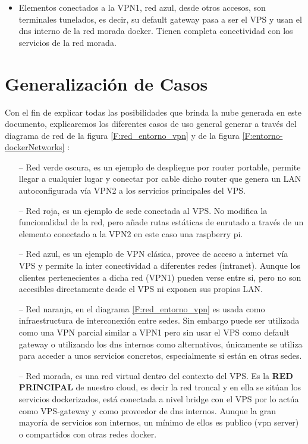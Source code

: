 \begin{itemize}
    \item Elementos conectados a la VPN1, red azul, desde otros accesos, son terminales tunelados, es decir, su default gateway pasa a ser el VPS y usan el dns interno de la red morada docker. Tienen completa conectividad con los servicios de la red morada.
\end{itemize}

\section{Generalización de Casos}
Con el fin de explicar todas las posibilidades que brinda la nube generada en este documento, explicaremos los diferentes casos de uso general generar a través del diagrama de red de la figura \ref{F:red_entorno_vpn} y de la figura \ref{F:entorno-dockerNetworks} :
\begin{itemize}
    \item[--] Red verde oscura, es un ejemplo de despliegue por router portable, permite llegar a cualquier lugar y conectar por cable dicho router que genera un LAN autoconfigurada vía VPN2 a los servicios principales del VPS.
    \item[--] Red roja, es un ejemplo de sede conectada al VPS. No modifica la funcionalidad de la red, pero añade rutas estáticas de enrutado a través de un elemento conectado a la VPN2 en este caso una raspberry pi.
    \item[--] Red azul, es un ejemplo de VPN clásica, provee de acceso a internet vía VPS y permite la inter conectividad a diferentes redes (intranet). Aunque los clientes pertenecientes a dicha red (VPN1) pueden verse entre si, pero no son accesibles directamente desde el VPS ni exponen sus propias LAN.
    \item[--] Red naranja, en el diagrama \ref{F:red_entorno_vpn} es usada como infraestructura de interconexión entre sedes. Sin embargo puede ser utilizada como una VPN parcial similar a VPN1 pero sin usar el VPS como default gateway o utilizando los dns internos como alternativos, únicamente se utiliza para acceder a unos servicios concretos, especialmente si están en otras sedes.
    \item[--] Red morada, es una red virtual dentro del contexto del VPS. Es la \textbf{RED PRINCIPAL} de nuestro cloud, es decir la red troncal y en ella se sitúan los servicios dockerizados, está conectada a nivel bridge con el VPS por lo actúa como VPS-gateway y  como proveedor de dns internos. Aunque la gran mayoría de servicios son internos, un mínimo de ellos es publico (vpn server) o compartidos con otras redes docker.

\end{itemize}
